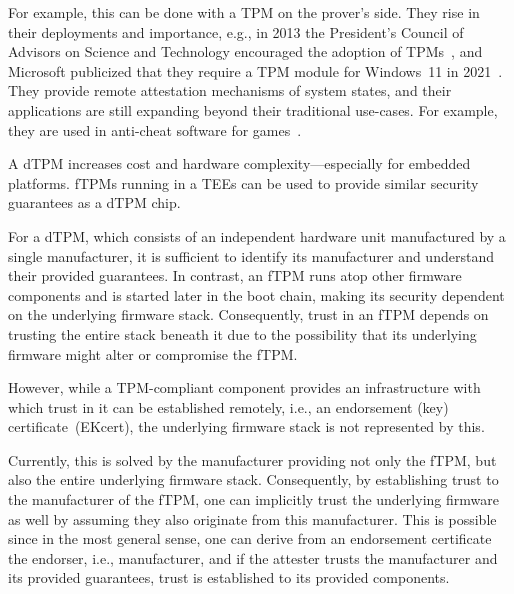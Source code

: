 For example, this can be done with a \ac{TPM} on the prover's side. They rise in their deployments and importance, e.g., in 2013 the President's Council of Advisors on Science and Technology encouraged the adoption of TPMs~\cite{usa}, and Microsoft publicized that they require a TPM module for Windows~11 in 2021~\cite{win11req}.
They provide remote attestation mechanisms of system states, and their applications are still expanding beyond their traditional use-cases. For example, they are used in anti-cheat software for games~\cite{valorant}.


A \ac{dTPM} increases cost and hardware complexity---especially for embedded platforms.
\Acp{fTPM} running in a \acp{TEE} can be used to provide similar security guarantees as a \ac{dTPM} chip.


For a \ac{dTPM}, which consists of an independent hardware unit manufactured by a single manufacturer, it is sufficient to identify its manufacturer and understand their provided guarantees.
In contrast, an \ac{fTPM} runs atop other firmware components and is started later in the boot chain, making its security dependent on the underlying firmware stack.
Consequently, trust in an \ac{fTPM} depends on trusting the entire stack beneath it due to the possibility that its underlying firmware might alter or compromise the \ac{fTPM}.


However, while a TPM-compliant component provides an infrastructure with which trust in it can be established remotely, i.e., an endorsement (key) certificate~(EKcert), the underlying firmware stack is not represented by this.


Currently, this is solved by the manufacturer providing not only the fTPM, but also the entire underlying firmware stack.
Consequently, by establishing trust to the manufacturer of the fTPM, one can implicitly trust the underlying firmware as well by assuming they also originate from this manufacturer.
This is possible since in the most general sense, one can derive from an endorsement certificate the endorser, i.e., manufacturer, and if the attester trusts the manufacturer and its provided guarantees, trust is established to its provided components.

